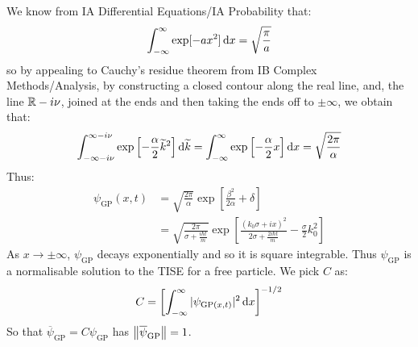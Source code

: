 \documentclass[../main.tex]{subfiles}
\begin{document}
We know from IA Differential Equations/IA Probability that:
\[
  \int_{-\infty}^{\infty} \exp[-a x^2] \d{x} = \sqrt{\frac{\pi}{a}}
\]
so by appealing to Cauchy's residue theorem from IB Complex Methods/Analysis, by constructing a closed contour along the real line, and, the line $\mathbb{R} - i\nu$, joined at the ends and then taking the ends off to $\pm \infty$, we obtain that:
\[
  \int_{-\infty - i\nu}^{\infty - i\nu} \exp\left[-\frac{\alpha}{2}\widetilde{k}^2\right] \d{\widetilde{k}} = \int_{-\infty}^{\infty} \exp\left[-\frac{\alpha}{2}x\right] \d{x} = \sqrt{\frac{2\pi}{\alpha}}
\]
Thus:
\begin{align*}
  \psi_{\text{GP}}(x, t) &= \sqrt{\frac{2\pi}{\alpha}}\exp\left[\frac{\beta^2}{2\alpha} + \delta\right] \\
                         &= \sqrt{\frac{2\pi}{\sigma + \frac{i\hbar t}{m}}}\exp\left[\frac{(k_0 \sigma + ix)^2}{2\sigma + \frac{2i \hbar t}{m}} - \frac{\sigma}{2} k^2_0\right]
\end{align*}
As $x \to \pm \infty$, $\psi_{\text{GP}}$ decays exponentially and so it is square integrable.
Thus $\psi_{\text{GP}}$ is a normalisable solution to the TISE for a free particle.
We pick $C$ as:
\[
  C = \left[\int_{-\infty}^{\infty} |\psi_{\text{GP}(x, t)}|^2 \d{x}\right]^{-1/2}
\]
So that $\overline{\psi}_{\text{GP}} = C \psi_{\text{GP}}$ has $\left\lVert \overline{\psi}_{\text{GP}} \right\rVert = 1$.
\end{document}
